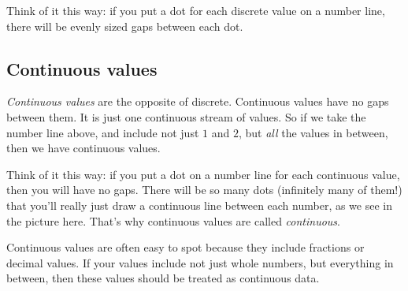 \documentclass[../../../main.tex]{subfiles}
\begin{document}
Think of it this way: if you put a dot for each discrete value on a number line, there will be evenly sized gaps between each dot.


\subsection{Continuous values}

\emph{Continuous values} are the opposite of discrete. Continuous values have no gaps between them. It is just one continuous stream of values. So if we take the number line above, and include not just $1$ and $2$, but \emph{all} the values in between, then we have continuous values. 

  \begin{center}
  \end{center}

Think of it this way: if you put a dot on a number line for each continuous value, then you will have no gaps. There will be so many dots (infinitely many of them!) that you'll really just draw a continuous line between each number, as we see in the picture here. That's why continuous values are called \emph{continuous}.

Continuous values are often easy to spot because they include fractions or decimal values. If your values include not just whole numbers, but everything in between, then these values should be treated as continuous data.
\end{document}
